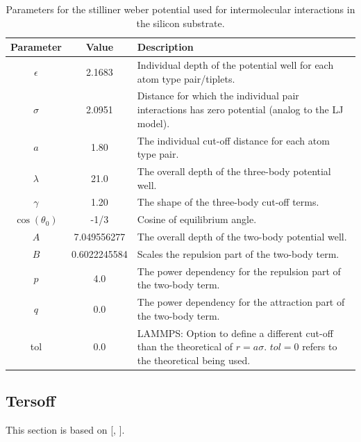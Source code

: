 \begin{table}[H]
  \begin{center}
  \caption{Parameters for the stilliner weber potential used for intermolecular interactions in the silicon substrate.}
  \label{tab:sw_param}
  \begin{tabular}{ | c | c | L{9cm} |} \hline
    Parameter & Value & Description \\ \hline 
    $\epsilon$ & 2.1683  & Individual depth of the potential well for each atom type pair/tiplets. \\ \hline
    $\sigma$ & 2.0951 & Distance for which the individual pair interactions has zero potential (analog to the LJ model). \\ \hline
    $a$ & 1.80 & The individual cut-off distance for each atom type pair. \\ \hline
    $\lambda$ & 21.0 & The overall depth of the three-body potential well. \\ \hline
    $\gamma$ & 1.20 & The shape of the three-body cut-off terms. \\ \hline
    $\cos{(\theta_0)}$ & -1/3 & Cosine of equilibrium angle. \\ \hline
    $A$ &  7.049556277 & The overall depth of the two-body potential well. \\ \hline
    $B$ &  0.6022245584 & Scales the repulsion part of the two-body term. \\ \hline
    $p$  & 4.0 & The power dependency for the repulsion part of the two-body term. \\ \hline
    $q$  & 0.0 & The power dependency for the attraction part of the two-body term. \\ \hline
    tol  & 0.0 & LAMMPS: Option to define a different cut-off than the theoretical of $r = a\sigma$. $tol = 0$ refers to the theoretical being used. \\ \hline
  \end{tabular}
  \end{center}
\end{table}



\subsection{Tersoff}


This section is based on [\cite{docs_lammps_tersoff}, \cite{PhysRevB.37.6991}].


